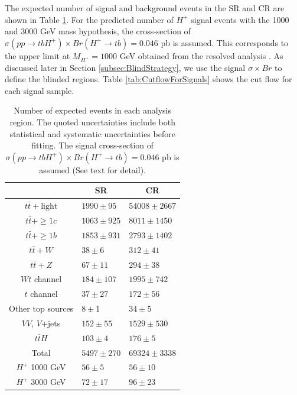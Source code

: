 The expected number of signal and background events in the SR and CR are shown in Table \ref{tab:PrefitYields}. For the predicted number of $H^{+}$ signal events with the 1000 and 3000 GeV mass hypothesis, the cross-section of ${\sigma}(pp{\rightarrow}tbH^{+}){\times}Br(H^{+}{\rightarrow}tb)=0.046$ pb is assumed. This corresponds to the upper limit at $M_{H^{+}}=1000$ GeV obtained from the resolved analysis \cite{HDBS-2021-02}. As discussed later in Section \ref{subsec:BlindStrategy}, we use the signal ${\sigma}{\times}Br$ to define the blinded regions. Table \ref{tab:CutflowForSignals} shows the cut flow for each signal sample.

\begin{table}[H]
  \centering
  \begin{tabular*}{120mm}{@{\extracolsep{\fill}}cll}
    \hline\hline
                            & \multicolumn{1}{c}{SR} & \multicolumn{1}{c}{CR}\\
    \hline
    $t\bar{t}+\text{light}$ & $1990\pm  95$           & $ 54008\pm 2667$ \\
    $t\bar{t}+\geq1c$       & $1063\pm 925$           & $  8011\pm 1450$ \\
    $t\bar{t}+\geq1b$       & $1853\pm 931$           & $  2793\pm 1402$ \\
    $t\bar{t}+W$            & $  38\pm   6$           & $   312\pm   41$ \\
    $t\bar{t}+Z$            & $  67\pm  11$           & $   294\pm   38$ \\
    $Wt$ channel            & $ 184\pm 107$           & $  1995\pm  742$ \\
    $t$ channel             & $  37\pm  27$           & $   172\pm   56$ \\
    Other top sources       & $   8\pm   1$           & $    34\pm    5$ \\
    $VV$, $V$+jets          & $ 152\pm  55$           & $  1529\pm  530$ \\
    $t\bar{t}H$             & $ 103\pm   4$           & $   176\pm    5$ \\
    \hline
    Total                   & $5497\pm 270$           & $ 69324\pm 3338$ \\
    \hline
    $H^{+}$ 1000 GeV        & $  56\pm  5$           & $     56\pm   10$ \\
    $H^{+}$ 3000 GeV        & $  72\pm 17$           & $     96\pm   23$ \\
    \hline\hline
  \end{tabular*}
  \caption{Number of expected events in each analysis region. The quoted uncertainties include both statistical and systematic uncertainties before fitting. The signal cross-section of ${\sigma}(pp{\rightarrow}tbH^{+}){\times}Br(H^{+}{\rightarrow}tb)=0.046$ pb is assumed (See text for detail).}
  \label{tab:PrefitYields}
\end{table}

